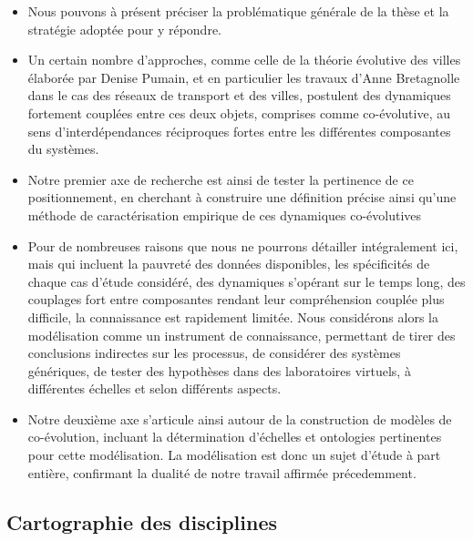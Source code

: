 \documentclass[11pt]{article}
\begin{document}
\begin{itemize}
	\item Nous pouvons à présent préciser la problématique générale de la thèse et la stratégie adoptée pour y répondre.
	\item Un certain nombre d'approches, comme celle de la théorie évolutive des villes élaborée par Denise Pumain, et en particulier les travaux d'Anne Bretagnolle dans le cas des réseaux de transport et des villes, postulent des dynamiques fortement couplées entre ces deux objets, comprises comme co-évolutive, au sens d'interdépendances réciproques fortes entre les différentes composantes du systèmes.
	\item Notre premier axe de recherche est ainsi de tester la pertinence de ce positionnement, en cherchant à construire une définition précise ainsi qu'une méthode de caractérisation empirique de ces dynamiques co-évolutives
	\item Pour de nombreuses raisons que nous ne pourrons détailler intégralement ici, mais qui incluent la pauvreté des données disponibles, les spécificités de chaque cas d'étude considéré, des dynamiques s'opérant sur le temps long, des couplages fort entre composantes rendant leur compréhension couplée plus difficile, la connaissance est rapidement limitée. Nous considérons alors la modélisation comme un instrument de connaissance, permettant de tirer des conclusions indirectes sur les processus, de considérer des systèmes génériques, de tester des hypothèses dans des laboratoires virtuels, à différentes échelles et selon différents aspects.
	\item Notre deuxième axe s'articule ainsi autour de la construction de modèles de co-évolution, incluant la détermination d'échelles et ontologies pertinentes pour cette modélisation. La modélisation est donc un sujet d'étude à part entière, confirmant la dualité de notre travail affirmée précedemment. 
\end{itemize}


\subsection*{Cartographie des disciplines}
\end{document}

